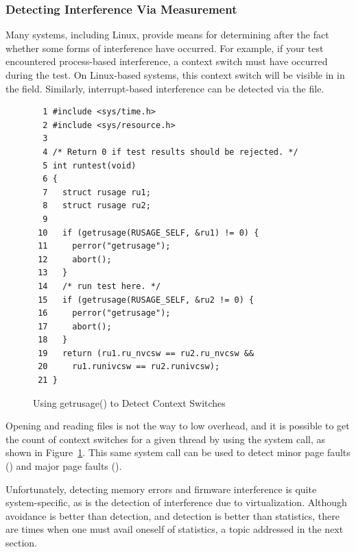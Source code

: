 \subsubsection{Detecting Interference Via Measurement}
\label{sec:debugging:Detecting Interference Via Measurement}


Many systems, including Linux, provide means for determining after the
fact whether some forms of interference have occurred.
For example, if your test encountered process-based interference,
a context switch must have occurred during the test.
On Linux-based systems, this context switch will be visible in
 in the  field.
Similarly, interrupt-based interference can be detected via the
 file.

\begin{figure}[tb]
{ \scriptsize
\begin{verbatim}
  1 #include <sys/time.h>
  2 #include <sys/resource.h>
  3 
  4 /* Return 0 if test results should be rejected. */
  5 int runtest(void)
  6 {
  7   struct rusage ru1;
  8   struct rusage ru2;
  9 
 10   if (getrusage(RUSAGE_SELF, &ru1) != 0) {
 11     perror("getrusage");
 12     abort();
 13   }
 14   /* run test here. */
 15   if (getrusage(RUSAGE_SELF, &ru2 != 0) {
 16     perror("getrusage");
 17     abort();
 18   }
 19   return (ru1.ru_nvcsw == ru2.ru_nvcsw &&
 20     ru1.runivcsw == ru2.runivcsw);
 21 }
\end{verbatim}
}
\caption{Using getrusage() to Detect Context Switches}
\label{fig:count:Using getrusage() to Detect Context Switches}
\end{figure}

Opening and reading files is not the way to low overhead, and it is
possible to get the count of context switches for a given thread
by using the  system call, as shown in
Figure~\ref{fig:count:Using getrusage() to Detect Context Switches}.
This same system call can be used to detect minor page faults ()
and major page faults ().

Unfortunately, detecting memory errors and firmware interference is quite
system-specific, as is the detection of interference due to virtualization.
Although avoidance is better than detection, and detection is better than
statistics, there are times when one must avail oneself of statistics,
a topic addressed in the next section.

